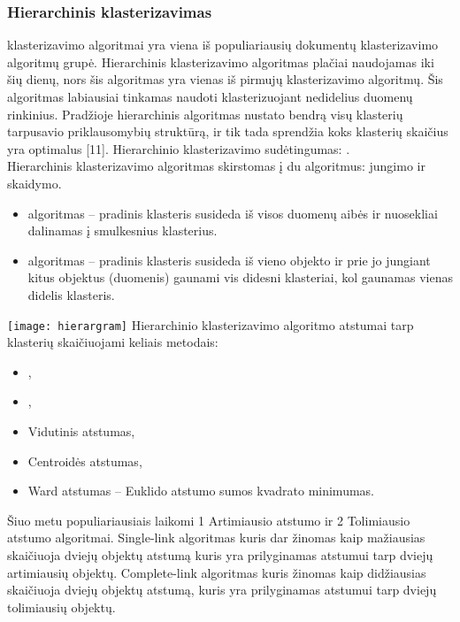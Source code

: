 \documentclass{VUMIFInfKursinis}
\begin{document}
\subsubsection{Hierarchinis klasterizavimas}
 klasterizavimo algoritmai yra viena iš populiariausių dokumentų klasterizavimo algoritmų grupė. Hierarchinis klasterizavimo algoritmas plačiai naudojamas iki šių dienų, nors šis algoritmas yra vienas iš pirmujų klasterizavimo algoritmų. Šis algoritmas labiausiai tinkamas naudoti klasterizuojant nedidelius duomenų rinkinius. Pradžioje hierarchinis algoritmas nustato bendrą visų klasterių tarpusavio priklausomybių struktūrą, ir tik tada sprendžia koks klasterių skaičius yra optimalus [11]. Hierarchinio klasterizavimo sudėtingumas: .\\
Hierarchinis klasterizavimo algoritmas skirstomas į du algoritmus: jungimo ir skaidymo.
\begin{itemize}
	\item {} algoritmas – pradinis klasteris susideda iš visos duomenų aibės ir nuosekliai dalinamas į smulkesnius klasterius.
	\item {} algoritmas – pradinis klasteris susideda iš vieno objekto ir prie jo jungiant kitus objektus (duomenis) gaunami vis didesni klasteriai, kol gaunamas vienas didelis klasteris.
\end{itemize}
\texttt{[image: hierargram]}
Hierarchinio klasterizavimo algoritmo atstumai tarp klasterių skaičiuojami keliais metodais:
\begin{itemize}
	\item {},
	\item {},
	\item Vidutinis atstumas,
	\item Centroidės atstumas,
	\item Ward atstumas – Euklido atstumo sumos kvadrato minimumas.
\end{itemize}
Šiuo metu populiariausiais laikomi 1 Artimiausio atstumo ir 2 Tolimiausio atstumo algoritmai.  Single-link algoritmas kuris dar žinomas kaip mažiausias skaičiuoja dviejų objektų atstumą kuris yra prilyginamas atstumui tarp dviejų artimiausių objektų. Complete-link algoritmas kuris žinomas kaip didžiausias skaičiuoja dviejų objektų atstumą, kuris yra prilyginamas atstumui tarp dviejų tolimiausių objektų.
\end{document}

